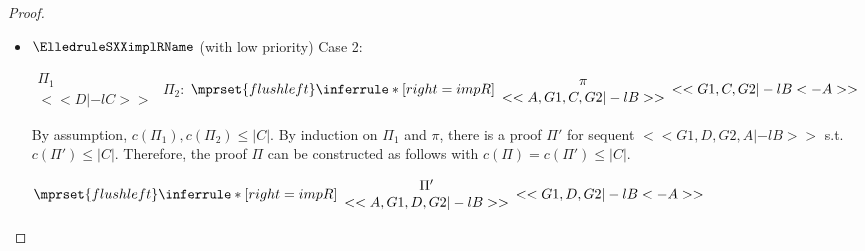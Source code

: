 \begin{proof}
\begin{enumerate}
\begin{itemize}
  \item $\ElledruleSXXimplRName$ (with low priority) Case 2:
      \begin{center}
        \scriptsize
        \begin{math}
          \begin{array}{c}
            \Pi_1 \\
            {<<D |-l C>>}
          \end{array}
        \end{math}
        \qquad\qquad
        $\Pi_2$:
        \begin{math}
          $$\mprset{flushleft}
          \inferrule* [right={\tiny impR}] {
            {
              \begin{array}{c}
                \pi \\
                {<<A, G1, C, G2 |-l B>>}
              \end{array}
            }
          }{<<G1, C, G2 |-l B <- A>>}
        \end{math}
      \end{center}
      By assumption, $c(\Pi_1),c(\Pi_2)\leq |C|$. By induction on $\Pi_1$ and $\pi$, there
      is a proof $\Pi'$ for sequent $<<G1, D, G2, A |-l B>>$ s.t. $c(\Pi') \leq |C|$.
      Therefore, the proof $\Pi$ can be constructed as follows with
      $c(\Pi) = c(\Pi') \leq |C|$.
      \begin{center}
        \scriptsize
        \begin{math}
          $$\mprset{flushleft}
          \inferrule* [right={\tiny impR}] {
            {
              \begin{array}{c}
                \Pi' \\
                {<<A, G1, D, G2 |-l B>>}
              \end{array}
            }
          }{<<G1, D, G2 |-l B <- A>>}
        \end{math}
      \end{center}


\end{itemize}
\end{enumerate}
\end{proof}
